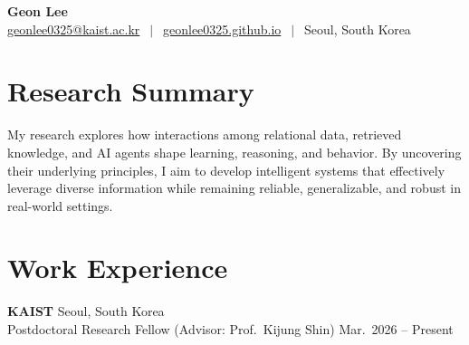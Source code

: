\documentclass[11pt, letterpaper]{article}
\newcommand{\sep}{\textcolor{MUTED}{$\,\mid\,$}}
\newcommand{\cvdate}[1]{{\small\color{MUTED}#1}}
\begin{document}
\pagestyle{empty}

\begin{center}
  {\Huge\bfseries\color{NAVY} Geon Lee}\\[0.45em]
  {\color{MUTED}
    \href{mailto:geonlee0325@kaist.ac.kr}{geonlee0325@kaist.ac.kr}
    \sep
    \href{https://geonlee0325.github.io}{geonlee0325.github.io}
    \sep
    Seoul, South Korea
  }
\end{center}
\vspace{-0.3em}

\vspace{28pt}

\section*{Research Summary}
\vspace{5pt}
My research explores how interactions among relational data, retrieved knowledge, and AI agents shape learning, reasoning, and behavior. By uncovering their underlying principles, I aim to develop intelligent systems that effectively leverage diverse information while remaining reliable, generalizable, and robust in real-world settings.

\vspace{10pt}
\section*{Work Experience}
\vspace{5pt}


\textbf{KAIST} \hfill \cvdate{Seoul, South Korea}\\
Postdoctoral Research Fellow \cvdate{(Advisor: Prof.\ Kijung Shin)} \hfill \cvdate{Mar.\ 2026 -- Present}
\vspace{3pt}
\end{document}
